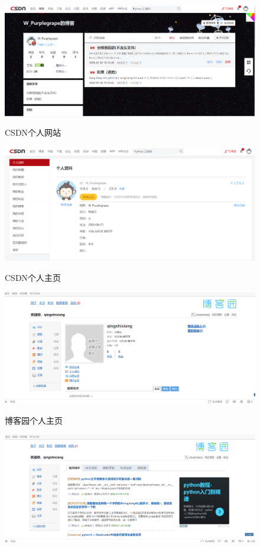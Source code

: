 \documentclass{article}
\begin{document}
\begin{itemize}
\begin{figure}[h!]
    	\centering
    	\includegraphics[scale=0.25]{csdngeren}
    	\label{fig:csdngeren}
    	\caption{CSDN个人网站}
    \end{figure}

\begin{figure}[h!]
	\centering
	\includegraphics[scale=0.25]{csdnwangzhan}
	\label{fig:csdnwangzhan}
	\caption{CSDN个人主页}
\end{figure}
\begin{figure}[h!]
\centering
\includegraphics[scale=0.25]{bokeyuangeren}
\label{fig:bokeyuangeren}
\caption{博客园个人主页}
\end{figure}
\begin{figure}[h!]
	\centering
	\includegraphics[scale=0.25]{bokeyuanwangzhan}

\end{figure}
\end{itemize}
\end{document}
